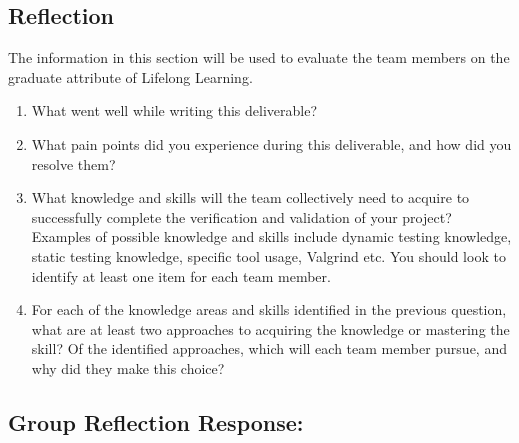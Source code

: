 \documentclass[12pt, titlepage]{article}
\begin{document}
\subsection{Reflection}

The information in this section will be used to evaluate the team members on the
graduate attribute of Lifelong Learning.



\begin{enumerate}
  \item What went well while writing this deliverable? 
  \item What pain points did you experience during this deliverable, and how
    did you resolve them?
  \item What knowledge and skills will the team collectively need to acquire to
  successfully complete the verification and validation of your project?
  Examples of possible knowledge and skills include dynamic testing knowledge,
  static testing knowledge, specific tool usage, Valgrind etc.  You should look to
  identify at least one item for each team member.
  \item For each of the knowledge areas and skills identified in the previous
  question, what are at least two approaches to acquiring the knowledge or
  mastering the skill?  Of the identified approaches, which will each team
  member pursue, and why did they make this choice?
\end{enumerate}

\subsection*{Group Reflection Response:}
\end{document}
